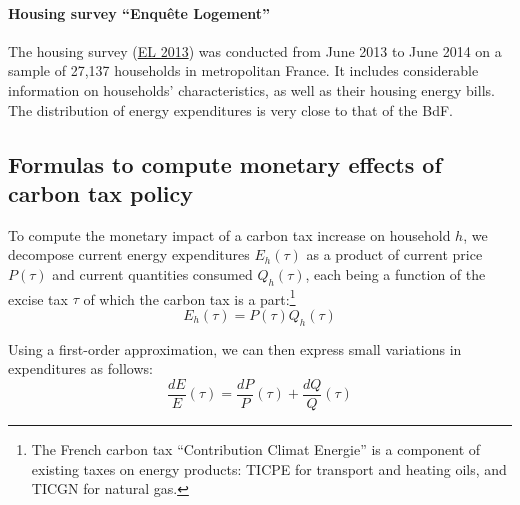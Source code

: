 \documentclass[12pt]{article} %
\begin{document}
\begin{appendices}
\paragraph{Housing survey ``Enquête Logement''}

The housing survey (\href{https://www.insee.fr/en/metadonnees/source/serie/s1004}{EL 2013}) was conducted from June 2013 to June 2014 on a sample of 27,137 households in metropolitan France. It includes considerable information on households' characteristics, as well as their housing energy bills. The distribution of energy expenditures is very close to that of the BdF.

\subsection{Formulas to compute monetary effects of carbon tax policy \label{appendix:formulas}}

To compute the monetary impact of a carbon tax increase on household $h$, we decompose current energy expenditures $E_h(\tau)$ as a product of current price $P(\tau)$ and current quantities consumed $Q_h(\tau)$, each being a function of the excise tax $\tau$ of which the carbon tax is  a part:\footnote{The French carbon tax ``Contribution Climat Energie'' is a component of existing taxes on energy products: TICPE for transport and heating oils, and TICGN for natural gas.} %
$$
E_h\left( \tau \right) = P\left( \tau \right) Q_h\left(\tau\right)
$$


\noindent
Using a first-order approximation, we can then express small variations in expenditures as follows:
\begin{equation}
\label{eq:dE}
\frac{dE}{E}\left(\tau\right) = \frac{dP}{P}\left(\tau\right) + \frac{dQ}{Q}\left(\tau\right)
\end{equation}



\end{appendices}
\end{document}
